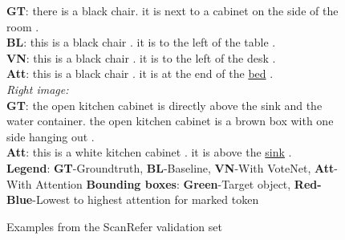 \documentclass[10pt,twocolumn,letterpaper]{article}
\begin{document}
\begin{figure}[b]
\begin{flushleft}
{			\textbf{GT}: there is a black chair. it is next to a cabinet on the side of the room .\\
			\textbf{BL}: this is a black chair . it is to the left of the table .\\
			\textbf{VN}: this is a black chair . it is to the left of the desk .\\
			\textbf{Att}: this is a black chair . it is at the end of the \underline{bed} .\\
			\vspace{.5\baselineskip}
			\textit{Right image:}\\
			\textbf{GT}: the open kitchen cabinet is directly above the sink and the water container. the open kitchen cabinet is a brown box with one side hanging out .\\
			\textbf{Att}: this is a white kitchen cabinet . it is above the \underline{sink} .\\
			\textbf{Legend}: \textbf{GT}-Groundtruth, \textbf{BL}-Baseline, \textbf{VN}-With VoteNet, \textbf{Att}-With Attention \textbf{Bounding boxes}: \textbf{\color{green} Green}-Target object, \textbf{{\color{red}Red}-{\color{blue}Blue}}-Lowest to highest attention for marked token
		}
	\end{flushleft}
	\vspace{-1.\baselineskip}
	\caption{Examples from the ScanRefer validation set}
	\label{fig:examples}
\end{figure}

{\small


}
\end{document}
